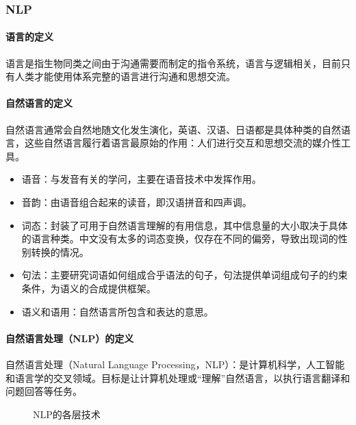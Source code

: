 \documentclass[letterpaper,10pt,english]{sphinxmanual}
\begin{document}
\subsubsection{NLP}
\label{\detokenize{chapter_AI_dive/NLP:nlp}}\label{\detokenize{chapter_AI_dive/NLP::doc}}

\paragraph{语言的定义}
\label{\detokenize{chapter_AI_dive/NLP:id1}}
语言是指生物同类之间由于沟通需要而制定的指令系统，语言与逻辑相关，目前只有人类才能使用体系完整的语言进行沟通和思想交流。


\paragraph{自然语言的定义}
\label{\detokenize{chapter_AI_dive/NLP:id2}}
自然语言通常会自然地随文化发生演化，英语、汉语、日语都是具体种类的自然语言，这些自然语言履行着语言最原始的作用：人们进行交互和思想交流的媒介性工具。
\begin{itemize}
\item {} 
语音：与发音有关的学问，主要在语音技术中发挥作用。

\item {} 
音韵：由语音组合起来的读音，即汉语拼音和四声调。

\item {} 
词态：封装了可用于自然语言理解的有用信息，其中信息量的大小取决于具体的语言种类。中文没有太多的词态变换，仅存在不同的偏旁，导致出现词的性别转换的情况。

\item {} 
句法：主要研究词语如何组成合乎语法的句子，句法提供单词组成句子的约束条件，为语义的合成提供框架。

\item {} 
语义和语用：自然语言所包含和表达的意思。

\end{itemize}


\paragraph{自然语言处理（NLP）的定义}
\label{\detokenize{chapter_AI_dive/NLP:id3}}
自然语言处理（Natural Language
Processing，NLP）：是计算机科学，人工智能和语言学的交叉领域。目标是让计算机处理或“理解”自然语言，以执行语言翻译和问题回答等任务。

\begin{figure}[H]
\centering
\capstart

\noindent{}
\caption{NLP的各层技术}\label{\detokenize{chapter_AI_dive/NLP:id21}}\end{figure}
\end{document}
